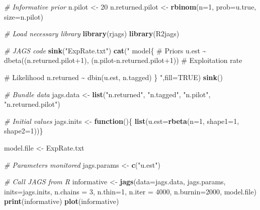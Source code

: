 \documentclass[
]{krantz}
\makeatletter
\newenvironment{Shaded}{\begin{snugshade}}{\end{snugshade}}
\newcommand{\AttributeTok}[1]{\textcolor[rgb]{0.27,0.27,0.27}{#1}}
\newcommand{\CommentTok}[1]{\textcolor[rgb]{0.37,0.37,0.37}{\textit{#1}}}
\newcommand{\ConstantTok}[1]{\textcolor[rgb]{0.37,0.37,0.37}{#1}}
\newcommand{\ControlFlowTok}[1]{\textcolor[rgb]{0.27,0.27,0.27}{\textbf{#1}}}
\newcommand{\DecValTok}[1]{\textcolor[rgb]{0.06,0.06,0.06}{#1}}
\newcommand{\FunctionTok}[1]{\textcolor[rgb]{0.27,0.27,0.27}{\textbf{#1}}}
\newcommand{\NormalTok}[1]{#1}
\newcommand{\OtherTok}[1]{\textcolor[rgb]{0.37,0.37,0.37}{#1}}
\newcommand{\StringTok}[1]{\textcolor[rgb]{0.5,0.5,0.5}{#1}}
\newenvironment{kframe}{%
\medskip{}
\setlength{\fboxsep}{.8em}
 \def\at@end@of@kframe{}%
 \ifinner\ifhmode%
  \def\at@end@of@kframe{\end{minipage}}%
  \begin{minipage}{\columnwidth}%
 \fi\fi%
 \def\FrameCommand##1{\hskip\@totalleftmargin \hskip-\fboxsep
 \colorbox{shadecolor}{##1}\hskip-\fboxsep
     \hskip-\linewidth \hskip-\@totalleftmargin \hskip\columnwidth}%
 \MakeFramed {\advance\hsize-\width
   \@totalleftmargin\z@ \linewidth\hsize
   \@setminipage}}%
 {\par\unskip\endMakeFramed%
 \at@end@of@kframe}
\renewenvironment{Shaded}{\begin{kframe}}{\end{kframe}}
\makeatother
\begin{document}
\begin{Shaded}
\begin{Highlighting}[]
\CommentTok{\# Informative prior}
\NormalTok{n.pilot }\OtherTok{\textless{}{-}} \DecValTok{20}
\NormalTok{n.returned.pilot }\OtherTok{\textless{}{-}} \FunctionTok{rbinom}\NormalTok{(}\AttributeTok{n=}\DecValTok{1}\NormalTok{, }\AttributeTok{prob=}\NormalTok{u.true, }\AttributeTok{size=}\NormalTok{n.pilot)}

\CommentTok{\# Load necessary library}
\FunctionTok{library}\NormalTok{(rjags)}
\FunctionTok{library}\NormalTok{(R2jags)}

\CommentTok{\# JAGS code}
\FunctionTok{sink}\NormalTok{(}\StringTok{"ExpRate.txt"}\NormalTok{)}
\FunctionTok{cat}\NormalTok{(}\StringTok{"}
\StringTok{model\{}
\StringTok{    \# Priors}
\StringTok{    u.est \textasciitilde{} dbeta((n.returned.pilot+1), }
\StringTok{         (n.pilot{-}n.returned.pilot+1)) \# Exploitation rate}

\StringTok{    \# Likelihood}
\StringTok{    n.returned \textasciitilde{} dbin(u.est, n.tagged)}
\StringTok{\}}
\StringTok{    "}\NormalTok{,}\AttributeTok{fill=}\ConstantTok{TRUE}\NormalTok{)}
\FunctionTok{sink}\NormalTok{()}

\CommentTok{\# Bundle data}
\NormalTok{jags.data }\OtherTok{\textless{}{-}} \FunctionTok{list}\NormalTok{(}\StringTok{"n.returned"}\NormalTok{, }\StringTok{"n.tagged"}\NormalTok{, }\StringTok{"n.pilot"}\NormalTok{, }\StringTok{"n.returned.pilot"}\NormalTok{)}

\CommentTok{\# Initial values}
\NormalTok{jags.inits }\OtherTok{\textless{}{-}} \ControlFlowTok{function}\NormalTok{()\{ }\FunctionTok{list}\NormalTok{(}\AttributeTok{u.est=}\FunctionTok{rbeta}\NormalTok{(}\AttributeTok{n=}\DecValTok{1}\NormalTok{, }\AttributeTok{shape1=}\DecValTok{1}\NormalTok{, }\AttributeTok{shape2=}\DecValTok{1}\NormalTok{))\}}

\NormalTok{model.file }\OtherTok{\textless{}{-}} \StringTok{\textquotesingle{}ExpRate.txt\textquotesingle{}}

\CommentTok{\# Parameters monitored}
\NormalTok{jags.params }\OtherTok{\textless{}{-}} \FunctionTok{c}\NormalTok{(}\StringTok{"u.est"}\NormalTok{)}

\CommentTok{\# Call JAGS from R}
\NormalTok{informative }\OtherTok{\textless{}{-}} \FunctionTok{jags}\NormalTok{(}\AttributeTok{data=}\NormalTok{jags.data, jags.params, }\AttributeTok{inits=}\NormalTok{jags.inits,}
                \AttributeTok{n.chains =} \DecValTok{3}\NormalTok{, }\AttributeTok{n.thin=}\DecValTok{1}\NormalTok{, }\AttributeTok{n.iter =} \DecValTok{4000}\NormalTok{, }\AttributeTok{n.burnin=}\DecValTok{2000}\NormalTok{,}
\NormalTok{                model.file)}
\FunctionTok{print}\NormalTok{(informative)}
\FunctionTok{plot}\NormalTok{(informative)}


\end{Highlighting}
\end{Shaded}
\end{document}
